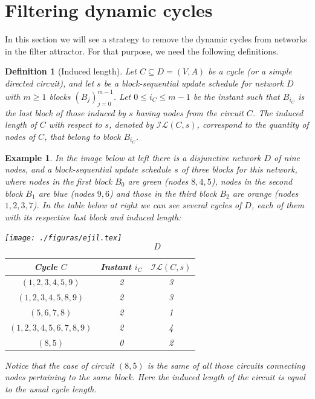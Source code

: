 \documentclass[preprint,12pt]{elsarticle}
\newtheorem{defn}{Definition}[section]
\newtheorem{exmp}{Example}
\begin{document}
\section{Filtering dynamic cycles}\label{sec-filt-cyc}

In this section we will see a strategy to remove the dynamic cycles from networks in the filter attractor. For that purpose, we need the following definitions. 

\begin{defn}[Induced length]\label{del-il}
Let $C\subseteq D=(V,A)$ be a cycle (or a simple directed circuit), and let $s$ be a block-sequential update schedule for network $D$ with $m\geq 1$ blocks $(B_j)_{j=0}^{m-1}$. Let $0\leq i_C \leq m-1$ be the instant such that $B_{i_C}$ is the last block of those induced by $s$ having nodes from the circuit $C$. The \textit{induced length of }$C$\textit{ with respect to }$s$, denoted by $\mathcal{IL}(C,s)$, correspond to the quantity of nodes of $C$, that belong to block $B_{i_C}$.
\end{defn}

\begin{exmp}
In the image below at left there is a disjunctive network $D$ of nine nodes, and a block-sequential update schedule $s$ of three blocks for this network, where nodes in the first block $B_0$ are green (nodes $8,4,5$), nodes in the second block $B_1$ are blue (nodes $9,6$) and those in the third block $B_2$ are orange (nodes $1,2,3,7$). In the table below at right we can see several cycles of $D$, each of them with its respective last block and induced length:

\begin{multicols}{2}
\texttt{[image: ./figuras/ejil.tex]}
$$D$$
\begin{center}
\begin{tabular}{c|c|c}
\hline
\textbf{Cycle }$C$ &  \textbf{Instant } $i_C$ & $\mathcal{IL}(C,s)$\\
\hline
  $(1,2,3,4,5,9)$ & 2 & 3 \\
  $(1,2,3,4,5,8,9)$ & 2 & 3 \\
  $(5,6,7,8)$ & 2 & 1 \\
  $(1,2,3,4,5,6,7,8,9)$ & 2 & 4 \\
  $(8,5)$ & 0 & 2 \\
\end{tabular}
\end{center} 
\end{multicols}

Notice that the case of circuit $(8,5)$ is the same of all those circuits connecting nodes pertaining to the same block. Here the induced length of the circuit is equal to the usual cycle length.
\end{exmp}
\end{document}

